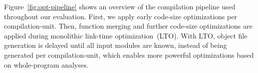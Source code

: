 Figure~\ref{fig:opt-pipeline} shows an overview of the compilation pipeline used
throughout our evaluation.
First, we apply early code-size optimizations per compilation-unit.
Then, function merging and further code-size optimizations are applied during
monolithic link-time optimization~(LTO).
With LTO, object file generation is delayed until all input modules are known,
instead of being generated per compilation-unit, which enables more powerful
optimizations based on whole-program analyses.

